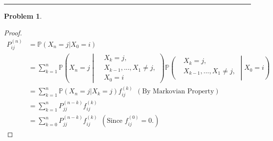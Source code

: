 \documentclass[a4paper, 10pt]{article}
\theoremstyle{definition}
\newtheorem{problem}{Problem}
\theoremstyle{hSol}
\begin{document}
\noindent\rule{16cm}{0.4pt}
\begin{problem} 
\end{problem}
\begin{proof} 
\begin{equation}
  \begin{split}
    P_{ij}^{(n)} &= \mathbb{P}\left(X_n=j|X_0=i\right) \\
    &= \sum_{k=1}^n \mathbb{P}\left(X_n = j\middle|
        \begin{aligned}
        & X_k=j, \\
        & X_{k-1}, ..., X_1 \ne j, \\
        & X_0=i
        \end{aligned}
    \right)
    \mathbb{P}\left(
        \begin{aligned}
        & X_k=j, \\
        & X_{k-1}, ..., X_1 \ne j, \\
        \end{aligned}
        \middle| X_0 = i
    \right)\\
    &= \sum_{k=1}^n \mathbb{P}\left(X_n=j|X_k=j\right)f^{(k)}_{ij}~~(\text{By Markovian Property})\\
    &= \sum_{k=1}^n P_{jj}^{(n-k)}f^{(k)}_{ij}\\
    &= \sum_{k=0}^n P_{jj}^{(n-k)}f^{(k)}_{ij}~~(\text{Since $f_{ij}^{(0)}=0$.})
  \end{split}
\end{equation}
\end{proof}
\end{document}
